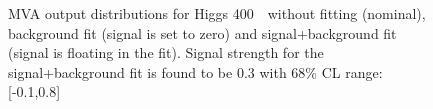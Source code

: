 \begin{figure}[!hbtp]
\caption{
MVA output distributions for Higgs 400~\GeV\ without fitting
(nominal), background fit (signal is set to zero) and
signal+background fit (signal is floating in the fit). Signal strength
for the signal+background fit is found to be 0.3 with 68\% CL range:
[-0.1,0.8] 
 }
\label{fig:fit_400}
\end{figure}


